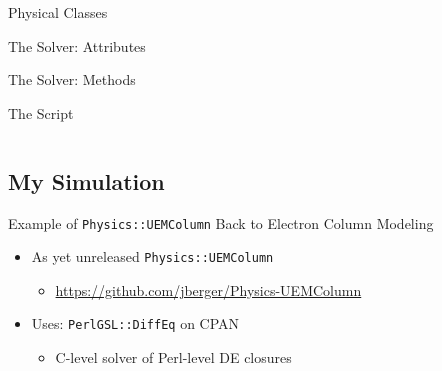 \documentclass[mathserif]{beamer}
\providecommand{\code}[1]{{\texttt{\scriptsize{#1}}}}
\providecommand{\inputcode}[1]{
  \begin{block}{}
    \scriptsize{}
  \end{block}
}
\begin{document}
\begin{frame}{Physical Classes}
  \inputcode{code/class0}
\end{frame}

\begin{frame}{The Solver: Attributes}
  \inputcode{code/class1}
\end{frame}

\begin{frame}{The Solver: Methods}
  \inputcode{code/class2}
\end{frame}

\begin{frame}{The Script}
  \begin{columns}
    \begin{column}{0.49\linewidth}
      \inputcode{code/example1}
    \end{column}
    \begin{column}{0.49\linewidth}
      \inputcode{code/example2}
      \vspace{4mm}
      \centering
    \end{column}
  \end{columns}
\end{frame}

\subsection{My Simulation}

\begin{frame}{Example of \texttt{Physics::UEMColumn}}
  Back to Electron Column Modeling
  
  \begin{itemize}
    \item As yet unreleased \code{Physics::UEMColumn}
    \begin{itemize}
      \item \url{https://github.com/jberger/Physics-UEMColumn}
    \end{itemize}
    \item Uses: \code{PerlGSL::DiffEq} on CPAN
    \begin{itemize}
      \item C-level solver of Perl-level DE closures
    \end{itemize}
  \end{itemize}
\end{frame}
\end{document}
